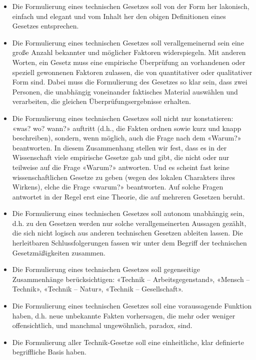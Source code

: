 \documentclass[11pt,a4paper]{article}
\begin{document}
\begin{itemize}
\item Die Formulierung eines technischen Gesetzes soll von der Form her
  lakonisch, einfach und elegant und vom Inhalt her den obigen Definitionen
  eines Gesetzes entsprechen.
\item Die Formulierung eines technischen Gesetzes soll verallgemeinernd sein
  eine große Anzahl bekannter und möglicher Faktoren widerspiegeln. Mit
  anderen Worten, ein Gesetz muss eine empirische Überprüfung an vorhandenen
  oder speziell gewonnenen Faktoren zulassen, die von quantitativer oder
  qualitativer Form sind. Dabei muss die Formulierung des Gesetzes so klar
  sein, dass zwei Personen, die unabhängig voneinander faktisches Material
  auswählen und verarbeiten, die gleichen Überprüfungsergebnisse erhalten.
\item Die Formulierung eines technischen Gesetzes soll nicht nur konstatieren:
  «was? wo? wann?» auftritt (d.h., die Fakten ordnen sowie kurz und knapp
  beschreiben), sondern, wenn möglich, auch die Frage nach dem «Warum?»
  beantworten. In diesem Zusammenhang stellen wir fest, dass es in der
  Wissenschaft viele empirische Gesetze gab und gibt, die nicht oder nur
  teilweise auf die Frage «Warum?» antworten. Und es scheint fast keine
  wissenschaftlichen Gesetze zu geben (wegen des lokalen Charakters ihres
  Wirkens), elche die Frage «warum?» beantworten.  Auf solche Fragen antwortet
  in der Regel erst eine Theorie, die auf mehreren Gesetzen beruht.
\item Die Formulierung eines technischen Gesetzes soll autonom unabhängig
  sein, d.h. zu den Gesetzen werden nur solche verallgemeinerten Aussagen
  gezählt, die sich nicht logisch aus anderen technischen Gesetzen ableiten
  lassen. Die herleitbaren Schlussfolgerungen fassen wir unter dem Begriff der
  technischen Gesetzmäßigkeiten zusammen.
\item Die Formulierung eines technischen Gesetzes soll gegenseitige
  Zusammenhänge berück\-sich\-tigen: «Technik -- Arbeitsgegenstand», «Mensch
  -- Technik», «Technik -- Natur», «Technik -- Gesellschaft».
\item Die Formulierung eines technischen Gesetzes soll eine voraussagende
  Funktion haben, d.h. neue unbekannte Fakten vorhersagen, die mehr oder
  weniger offensichtlich, und manchmal ungewöhnlich, paradox, sind.
\item Die Formulierung aller Technik-Gesetze soll eine einheitliche, klar
  definierte begriffliche Basis haben.
\end{itemize}
\end{document}
